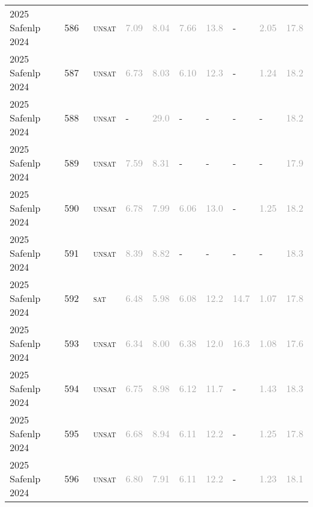 \begin{center}
{\begin{longtable}{@{}llllllllll@{}}
2025 Safenlp 2024 & 586 & ~\textsc{unsat} & \textcolor{darkgray}{7.09} & \textcolor{darkgray}{8.04} & \textcolor{darkgray}{7.66} & \textcolor{darkgray}{13.8} & - & \textcolor{darkgray}{2.05} & \textcolor{darkgray}{17.8} \\
2025 Safenlp 2024 & 587 & ~\textsc{unsat} & \textcolor{darkgray}{6.73} & \textcolor{darkgray}{8.03} & \textcolor{darkgray}{6.10} & \textcolor{darkgray}{12.3} & - & \textcolor{darkgray}{1.24} & \textcolor{darkgray}{18.2} \\
2025 Safenlp 2024 & 588 & ~\textsc{unsat} & - & \textcolor{darkgray}{29.0} & - & - & - & - & \textcolor{darkgray}{18.2} \\
2025 Safenlp 2024 & 589 & ~\textsc{unsat} & \textcolor{darkgray}{7.59} & \textcolor{darkgray}{8.31} & - & - & - & - & \textcolor{darkgray}{17.9} \\
2025 Safenlp 2024 & 590 & ~\textsc{unsat} & \textcolor{darkgray}{6.78} & \textcolor{darkgray}{7.99} & \textcolor{darkgray}{6.06} & \textcolor{darkgray}{13.0} & - & \textcolor{darkgray}{1.25} & \textcolor{darkgray}{18.2} \\
2025 Safenlp 2024 & 591 & ~\textsc{unsat} & \textcolor{darkgray}{8.39} & \textcolor{darkgray}{8.82} & - & - & - & - & \textcolor{darkgray}{18.3} \\
2025 Safenlp 2024 & 592 & ~\textsc{sat} & \textcolor{darkgray}{6.48} & \textcolor{darkgray}{5.98} & \textcolor{darkgray}{6.08} & \textcolor{darkgray}{12.2} & \textcolor{darkgray}{14.7} & \textcolor{darkgray}{1.07} & \textcolor{darkgray}{17.8} \\
2025 Safenlp 2024 & 593 & ~\textsc{unsat} & \textcolor{darkgray}{6.34} & \textcolor{darkgray}{8.00} & \textcolor{darkgray}{6.38} & \textcolor{darkgray}{12.0} & \textcolor{darkgray}{16.3} & \textcolor{darkgray}{1.08} & \textcolor{darkgray}{17.6} \\
2025 Safenlp 2024 & 594 & ~\textsc{unsat} & \textcolor{darkgray}{6.75} & \textcolor{darkgray}{8.98} & \textcolor{darkgray}{6.12} & \textcolor{darkgray}{11.7} & - & \textcolor{darkgray}{1.43} & \textcolor{darkgray}{18.3} \\
2025 Safenlp 2024 & 595 & ~\textsc{unsat} & \textcolor{darkgray}{6.68} & \textcolor{darkgray}{8.94} & \textcolor{darkgray}{6.11} & \textcolor{darkgray}{12.2} & - & \textcolor{darkgray}{1.25} & \textcolor{darkgray}{17.8} \\
2025 Safenlp 2024 & 596 & ~\textsc{unsat} & \textcolor{darkgray}{6.80} & \textcolor{darkgray}{7.91} & \textcolor{darkgray}{6.11} & \textcolor{darkgray}{12.2} & - & \textcolor{darkgray}{1.23} & \textcolor{darkgray}{18.1} \\

\end{longtable}}
\end{center}
